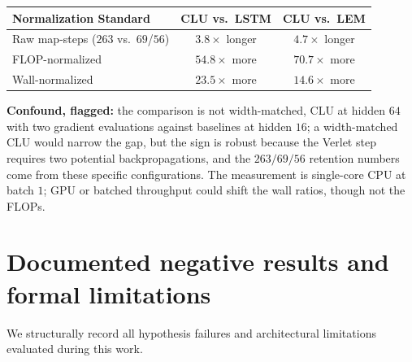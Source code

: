 \documentclass{article}
\begin{document}
\begin{center}
\begin{tabular}{lcc}
\toprule
Normalization Standard & CLU vs.\ LSTM & CLU vs.\ LEM \\
\midrule
Raw map-steps ($263$ vs.\ $69$/$56$) & $3.8\times$ longer & $4.7\times$ longer \\
FLOP-normalized & $\mathbf{54.8\times}$ more & $\mathbf{70.7\times}$ more \\
Wall-normalized & $\mathbf{23.5\times}$ more & $\mathbf{14.6\times}$ more \\
\bottomrule
\end{tabular}
\end{center}

\textbf{Confound, flagged:} the comparison is not width-matched, CLU at hidden $64$ with two gradient evaluations against baselines at hidden $16$; a width-matched CLU would narrow the gap, but the sign is robust because the Verlet step requires two potential backpropagations, and the $263/69/56$ retention numbers come from these specific configurations. The measurement is single-core CPU at batch $1$; GPU or batched throughput could shift the wall ratios, though not the FLOPs.

\section{Documented negative results and formal limitations}\label{app:neg}

We structurally record all hypothesis failures and architectural limitations evaluated during this work.
\end{document}
